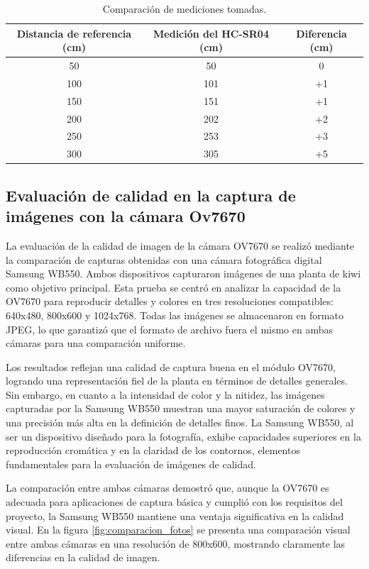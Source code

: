 \newpage

\begin{table}[h]
	\centering
	\caption[Comparación de mediciones tomadas]{Comparación de mediciones tomadas.}
	\begin{tabular}{c c c}    
		\toprule
		\textbf{Distancia de referencia (cm)} 	 & \textbf{Medición del HC-SR04 (cm)} 		& \textbf{Diferencia (cm)}  \\
		\midrule
		50 & 50 & 0 \\		
		100 & 101 & +1 \\	
		150 & 151 & +1 \\	
            200 & 202 & +2 \\	
            250 & 253 & +3 \\	
            300 & 305 & +5 \\	
		\bottomrule
		\hline
	\end{tabular}
	\label{tab:HCSR04_comparacion}
\end{table}

\subsection{Evaluación de calidad en la captura de imágenes con la cámara Ov7670}

La evaluación de la calidad de imagen de la cámara OV7670 se realizó mediante la comparación de capturas obtenidas con una cámara fotográfica digital Samsung WB550. Ambos dispositivos capturaron imágenes de una planta de kiwi como objetivo principal. Esta prueba se centró en analizar la capacidad de la OV7670 para reproducir detalles y colores en tres resoluciones compatibles: 640x480, 800x600 y 1024x768. Todas las imágenes se almacenaron en formato JPEG, lo que garantizó que el formato de archivo fuera el mismo en ambas cámaras para una comparación uniforme.

Los resultados reflejan una calidad de captura buena en el módulo OV7670, logrando una representación fiel de la planta en términos de detalles generales. Sin embargo, en cuanto a la intensidad de color y la nitidez, las imágenes capturadas por la Samsung WB550 muestran una mayor saturación de colores y una precisión más alta en la definición de detalles finos. La Samsung WB550, al ser un dispositivo diseñado para la fotografía, exhibe capacidades superiores en la reproducción cromática y en la claridad de los contornos, elementos fundamentales para la evaluación de imágenes de calidad.

La comparación entre ambas cámaras demostró que, aunque la OV7670 es adecuada para aplicaciones de captura básica y cumplió con los requisitos del proyecto, la Samsung WB550 mantiene una ventaja significativa en la calidad visual. En la figura \ref{fig:comparacion_fotos} se presenta una comparación visual entre ambas cámaras en una resolución de 800x600, mostrando claramente las diferencias en la calidad de imagen.


